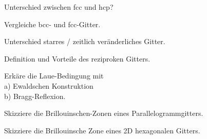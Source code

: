\documentclass[a5paper,12pt,ngerman,print,grid=front]{kartei}
\begin{document}
	\begin{karte}{
		Unterschied zwischen fcc und hcp?
		}
          
          
          
    \end{karte}


	\begin{karte}{
		Vergleiche bcc- und fcc-Gitter.
		}
          
          
          
    \end{karte}


	\begin{karte}{
		Unterschied starres / zeitlich veränderliches Gitter.
		}
          
          
          
    \end{karte}


	\begin{karte}{
		Definition und Vorteile des reziproken Gitters.
		}
          
          
          
    \end{karte}


	\begin{karte}{
		Erkäre die Laue-Bedingung mit \\
        a) Ewaldschen Konstruktion \\
        b) Bragg-Reflexion.
		}
          
          
          
    \end{karte}


	\begin{karte}{
		Skizziere die Brillouinschen-Zonen eines Parallelogrammgitters.
		}
          
          
          
    \end{karte}


	\begin{karte}{
		Skizziere die Brillouinsche Zone eines 2D hexagonalen Gitters.
		}
          
          
          
    \end{karte}
\end{document}
